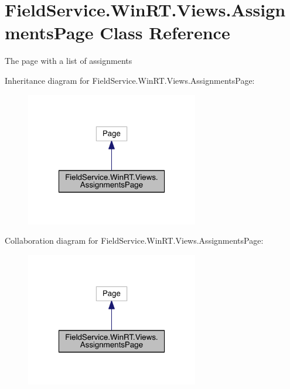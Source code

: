 \hypertarget{class_field_service_1_1_win_r_t_1_1_views_1_1_assignments_page}{\section{Field\+Service.\+Win\+R\+T.\+Views.\+Assignments\+Page Class Reference}
\label{class_field_service_1_1_win_r_t_1_1_views_1_1_assignments_page}
}


The page with a list of assignments  




Inheritance diagram for Field\+Service.\+Win\+R\+T.\+Views.\+Assignments\+Page\+:
\nopagebreak
\begin{figure}[H]
\begin{center}
\leavevmode
\includegraphics[width=214pt]{class_field_service_1_1_win_r_t_1_1_views_1_1_assignments_page__inherit__graph}
\end{center}
\end{figure}


Collaboration diagram for Field\+Service.\+Win\+R\+T.\+Views.\+Assignments\+Page\+:
\nopagebreak
\begin{figure}[H]
\begin{center}
\leavevmode
\includegraphics[width=214pt]{class_field_service_1_1_win_r_t_1_1_views_1_1_assignments_page__coll__graph}
\end{center}
\end{figure}
